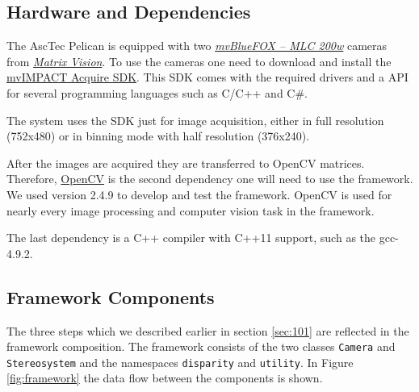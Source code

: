 \documentclass[11pt]{article}
\begin{document}
\subsection{Hardware and Dependencies}\label{sec:hardware}
The AscTec Pelican is equipped with two  \emph{\href{http://www.matrix-vision.com/USB2.0-single-board-camera-mvbluefox-mlc.html?camera=mvBlueFOX-MLC200wC&selectInterface=Alle&selectMpixels=Alle&selectFps=Alle&selectSensor=Alle&selectColor=Alle&selectSize=Alle&selectShutter=Alle&selectModel=Alle&col=1&row=0}{mvBlueFOX -- MLC 200w}} cameras from \emph{\href{http://www.matrix-vision.com/home-en.html}{Matrix Vision}}. To use the cameras one need to download and install the \href{http://www.matrix-vision.com/programming-interface-mvimpact-acquire.html}{mvIMPACT Acquire SDK}. This SDK comes with the required drivers and a API for several programming languages such as C/C++ and C\#. 

The system uses the SDK just for image acquisition, either in full resolution (752x480) or in binning mode with half resolution (376x240).

After the images are acquired they are transferred to OpenCV matrices. Therefore, \href{http://opencv.org/}{OpenCV} is the second dependency one will need to use the framework. We used version 2.4.9 to develop and test the framework. OpenCV is used for nearly every image processing and computer vision task in the framework.

The last dependency is a C++ compiler with C++11 support, such as the gcc-4.9.2.

\subsection{Framework Components}
The three steps which we described earlier in section \ref{sec:101} are reflected in the framework composition. The framework consists of the two classes \texttt{Camera} and \texttt{Stereosystem} and the namespaces \texttt{disparity} and \texttt{utility}. In Figure \ref{fig:framework} the data flow between the components is shown.
\end{document}
